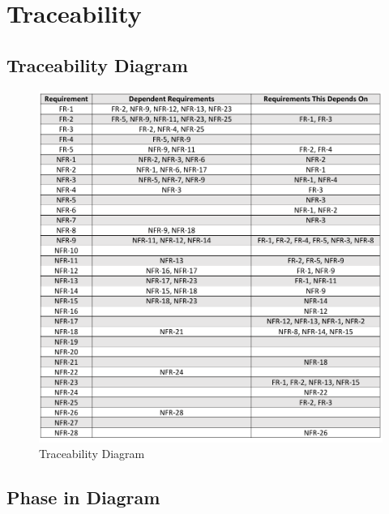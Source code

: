 \documentclass[12pt]{article}
\begin{document}
\raggedright

\section{Traceability}
 	
\subsection{Traceability Diagram}

\begin{figure}[H]
  \begin{center}
    \includegraphics{T-Matrix.pdf}
  \caption{Traceability Diagram}
  \label{TraceDiagram} 
  \end{center}
\end{figure}

\subsection{Phase in Diagram}
\end{document}
